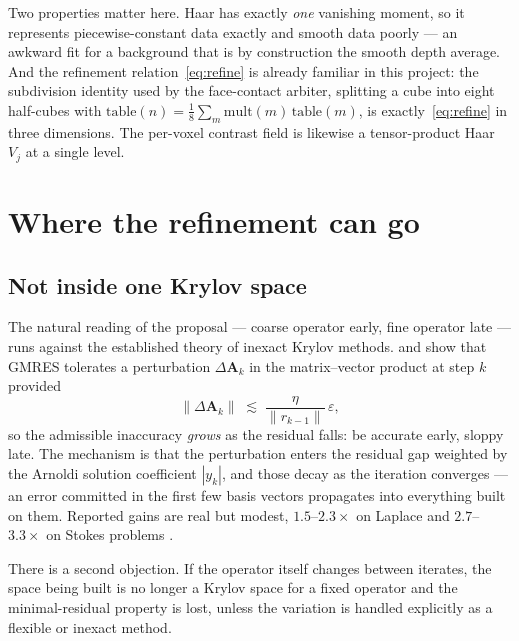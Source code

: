 \documentclass[11pt,a4paper]{article}
\newcommand{\bA}{\mathbf{A}}
\begin{document}
Two properties matter here.  Haar has exactly \emph{one} vanishing moment, so
it represents piecewise-constant data exactly and smooth data poorly --- an
awkward fit for a background that is by construction the smooth depth average.
And the refinement relation~\eqref{eq:refine} is already familiar in this
project: the subdivision identity used by the face-contact arbiter, splitting a
cube into eight half-cubes with
$\mathrm{table}(n) = \tfrac18\sum_m \mathrm{mult}(m)\,\mathrm{table}(m)$, is
exactly~\eqref{eq:refine} in three dimensions.  The per-voxel contrast field is
likewise a tensor-product Haar $V_j$ at a single level.

\section{Where the refinement can go}

\subsection{Not inside one Krylov space}

The natural reading of the proposal --- coarse operator early, fine operator
late --- runs against the established theory of inexact Krylov methods.
\citet{bouras2005} and \citet{simoncini2003} show that GMRES tolerates a
perturbation $\Delta\bA_k$ in the matrix--vector product at step $k$ provided
\begin{equation}\label{eq:relax}
  \lVert \Delta\bA_k\rVert \;\lesssim\; \frac{\eta}{\lVert r_{k-1}\rVert}\,
  \varepsilon ,
\end{equation}
so the admissible inaccuracy \emph{grows} as the residual falls: be accurate
early, sloppy late.  The mechanism is that the perturbation enters the residual
gap weighted by the Arnoldi solution coefficient $|y_k|$, and those decay as
the iteration converges --- an error committed in the first few basis vectors
propagates into everything built on them.  Reported gains are real but modest,
$1.5$--$2.3\times$ on Laplace and $2.7$--$3.3\times$ on Stokes problems
\citep{vandeneshof2004}.

There is a second objection.  If the operator itself changes between iterates,
the space being built is no longer a Krylov space for a fixed operator and the
minimal-residual property is lost, unless the variation is handled explicitly
as a flexible \citep{saad1993} or inexact method.
\end{document}
